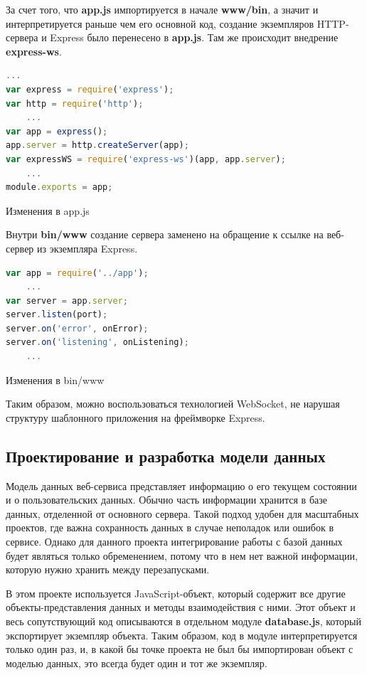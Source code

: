 За счет того, что \textbf{app.js} импортируется в начале \textbf{www/bin}, а значит и интерпретируется раньше чем его основной код, создание экземпляров HTTP-сервера и Express было перенесено в \textbf{app.js}. Там же происходит внедрение \textbf{express-ws}.
\begin{ListingEnv}[H]
\begin{lstlisting}[language=JavaScript]
	...
var express = require('express');
var http = require('http');
	...
var app = express();
app.server = http.createServer(app); 
var expressWS = require('express-ws')(app, app.server);
	...
module.exports = app;
\end{lstlisting}
\caption{Изменения в app.js}
\label{list:appjs-ws}
\end{ListingEnv}  
Внутри \textbf{bin/www} создание сервера заменено на обращение к ссылке на веб-сервер из экземпляра Express.
\begin{ListingEnv}[H]
\begin{lstlisting}[language=JavaScript]
var app = require('../app');
	...
var server = app.server;
server.listen(port);
server.on('error', onError);
server.on('listening', onListening);
	...
\end{lstlisting}
\caption{Изменения в bin/www}
\label{list:www-ws}
\end{ListingEnv}
Таким образом, можно воспользоваться технологией WebSocket, не нарушая структуру шаблонного приложения на фреймворке Express. 

\subsection{Проектирование и разработка модели данных}
Модель данных веб-сервиса представляет информацию о его текущем состоянии и о пользовательских данных. Обычно часть информации хранится в базе данных, отделенной от основного сервера. Такой подход удобен для масштабных проектов, где важна сохранность данных в случае неполадок или ошибок в сервисе. Однако для данного проекта интегрирование работы с базой данных будет являться только обременением, потому что в нем нет важной информации, которую нужно хранить между перезапусками.

В этом проекте используется JavaScript-объект, который содержит все другие объекты-представления данных и методы взаимодействия с ними. Этот объект и весь сопутствующий код описываются в отдельном модуле \textbf{database.js}, который экспортирует экземпляр объекта. Таким образом, код в модуле интерпретируется только один раз, и, в какой бы точке проекта не был бы импортирован объект с моделью данных, это всегда будет один и тот же экземпляр.

